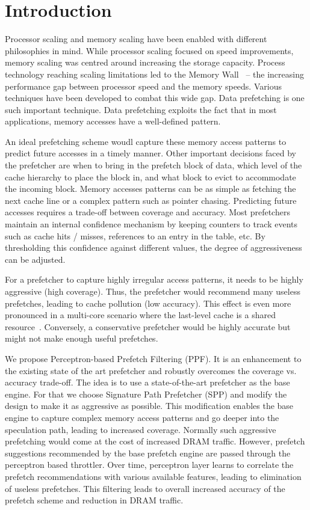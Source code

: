 \section{Introduction}
\label{Introduction}
Processor scaling and memory scaling have been enabled with different
philosophies in mind.  While processor scaling focused on speed improvements,
memory scaling was centred around increasing the storage capacity.  Process
technology reaching scaling limitations led to the Memory Wall~\cite{MemWall}
-- the increasing performance gap between processor speed and the memory
speeds.  Various techniques have been developed to combat this wide gap. Data
prefetching is one such important technique. Data prefetching exploits the
fact that in most applications, memory accesses have a well-defined pattern.

An ideal prefetching scheme woudl capture these memory access patterns to
predict future accesses in a timely manner.  Other important decisions faced
by the prefetcher are when to bring in the prefetch block of data, which level
of the cache hierarchy to place the block in, and what block to evict to
accommodate the incoming block.  Memory accesses patterns can be as simple as
fetching the next cache line or a complex pattern such as pointer chasing.
Predicting future accesses requires a trade-off between coverage and accuracy.
Most prefetchers maintain an internal confidence mechanism by keeping counters
to track events such as cache hits / misses, references to an entry in the
table, etc. By thresholding this confidence against different values, the
degree of aggressiveness can be adjusted.

For a prefetcher to capture highly irregular access patterns, it needs to be
highly aggressive (high coverage).  Thus, the prefetcher would recommend many
useless prefetches, leading to cache pollution (low accuracy).  This effect is
even more pronounced in a multi-core scenario where the last-level cache is a
shared resource~\cite{Friendly}.  Conversely, a conservative prefetcher would
be highly accurate but might not make enough useful prefetches.

We propose Perceptron-based Prefetch Filtering (PPF).  It is an enhancement to
the existing state of the art prefetcher and robustly overcomes the coverage
vs.  accuracy trade-off.  The idea is to use a state-of-the-art prefetcher as
the base engine.  For that we choose Signature Path Prefetcher (SPP) and
modify the design to make it as aggressive as possible.  This modification
enables the base engine to capture complex memory access patterns and go
deeper into the speculation path, leading to increased coverage. Normally such
aggressive prefetching would come at the cost of increased DRAM traffic.
However, prefetch suggestions recommended by the base prefetch engine are
passed through the perceptron based throttler.  Over time, perceptron layer
learns to correlate the prefetch recommendations with various available
features, leading to elimination of useless prefetches. This filtering leads
to overall increased accuracy of the prefetch scheme and reduction in DRAM
traffic.

